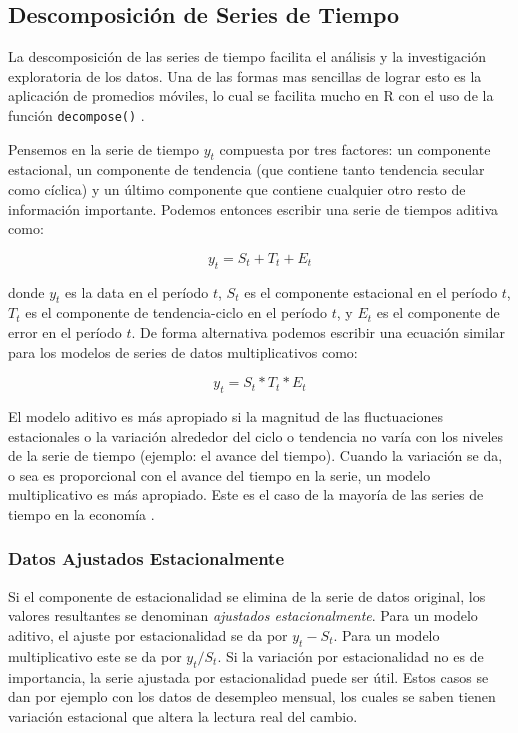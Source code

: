 \subsection{Descomposición de Series de Tiempo}
La descomposición de las series de tiempo facilita el análisis y la investigación exploratoria de los datos. Una de las formas mas sencillas de lograr esto es la aplicación de promedios móviles, lo cual se facilita mucho en R con el uso de la función \texttt{decompose()} \cite{daroczi}.

Pensemos en la serie de tiempo $y_t$ compuesta por tres factores: un componente estacional, un componente de tendencia (que contiene tanto tendencia secular como cíclica) y un último componente que contiene cualquier otro resto de información importante. Podemos entonces escribir una serie de tiempos aditiva como:

\[ y_t = S_t + T_t + E_t \]

donde $y_t$ es la data en el período $t$, $S_t$ es el componente estacional en el período $t$, $T_t$ es el componente de tendencia-ciclo en el período $t$, y $E_t$ es el componente de error en el período $t$. De forma alternativa podemos escribir una ecuación similar para los modelos de series de datos multiplicativos como:

\[ y_t = S_t * T_t * E_t  \]

El modelo aditivo es más apropiado si la magnitud de las fluctuaciones estacionales o la variación alrededor del ciclo o tendencia no varía con los niveles de la serie de tiempo (ejemplo: el avance del tiempo). Cuando la variación se da, o sea es proporcional con el avance del tiempo en la serie, un modelo multiplicativo es más apropiado. Este es el caso de la mayoría de las series de tiempo en la economía \cite{hyndman}.

\subsubsection{Datos Ajustados Estacionalmente}
Si el componente de estacionalidad se elimina de la serie de datos original, los valores resultantes se denominan \emph{ajustados estacionalmente}. Para un modelo aditivo, el ajuste por estacionalidad se da por $y_t - S_t$. Para un modelo multiplicativo este se da por $y_t/S_t$. Si la variación por estacionalidad no es de importancia, la serie ajustada por estacionalidad puede ser útil. Estos casos se dan por ejemplo con los datos de desempleo mensual, los cuales se saben tienen variación estacional que altera la lectura real del cambio.

